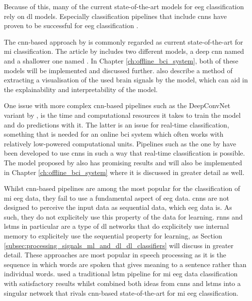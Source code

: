 Because of this, many of the current state-of-the-art models for \gls{eeg} classification rely on \gls{dl} models.
Especially classification pipelines that include \glspl{cnn} have proven to be successful for \gls{eeg} classification \citep{fbcnet, eeg_mi_model_mussi, eeg_mi_model_deep_cnn_spatial_filters, eeg_model_hbm, eeg_model_esi, eeg_model_eegnet}.

The \gls{cnn}-based approach by \citet{eeg_model_hbm} is commonly regarded as current state-of-the-art for \gls{mi} classification.
The article by \citet{eeg_model_hbm} includes two different models, a deep \gls{cnn} named  and a shallower one named .
In Chapter \ref{ch:offline_bci_system}, both of these models will be implemented and discussed further.
 also describe a method of extracting a visualisation of the used brain signals by the model, which can aid in the explainability and interpretability of the model.

One issue with more complex \gls{cnn}-based pipelines such as the DeepConvNet variant by \citet{eeg_model_hbm}, is the time and computational resources it takes to train the model and do predictions with it.
The latter is an issue for real-time classification, something that is needed for an online \gls{bci} system which often works with relatively low-powered computational units.
Pipelines such as the one by \citet{eeg_model_eegnet} have been developed to use \glspl{cnn} in such a way that real-time classification is possible.
The model proposed by \citet{eeg_model_eegnet} also has promising results and will also be implemented in Chapter \ref{ch:offline_bci_system} where it is discussed in greater detail as well.

Whilst \gls{cnn}-based pipelines are among the most popular for the classification of \gls{mi} \gls{eeg} data, they fail to use a fundamental aspect of \gls{eeg} data.
\Glspl{cnn} are not designed to perceive the input data as sequential data, which \gls{eeg} data is.
As such, they do not explicitely use this property of the data for learning.
\Glspl{rnn} and \glspl{lstm} in particular are a type of \gls{dl} networks that do explicitely use internal memory to explicitely use the sequential property for learning, as Section \ref{subsec:processing_signals_ml_and_dl_dl_classifiers} will discuss in greater detail.
These approaches are most popular in speech processing as it is the sequence in which words are spoken that gives meaning to a sentence rather than individual words.
 used a traditional \gls{lstm} pipeline for \gls{mi} \gls{eeg} data classification with satisfactory results whilst \citet{lstm_cnn_mi_eeg} combined both ideas from \glspl{cnn} and \glspl{lstm} into a singular network that rivals \gls{cnn}-based state-of-the-art for \gls{mi} \gls{eeg} classification.


